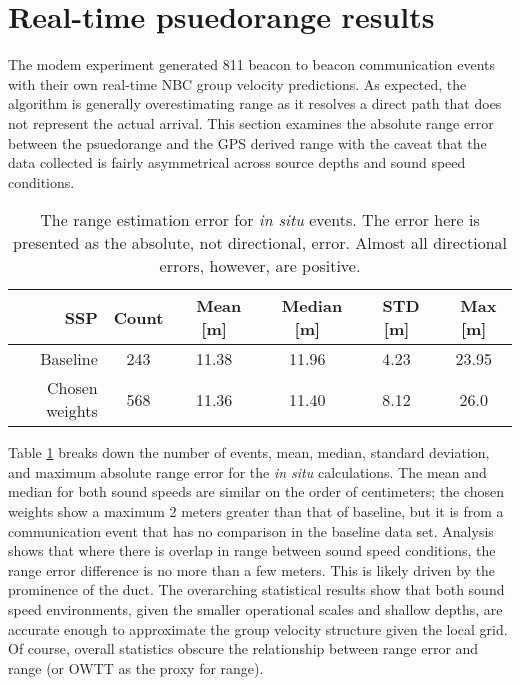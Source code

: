 \FloatBarrier
\section{\label{sec:4} Real-time psuedorange results}

The modem experiment generated 811 beacon to beacon communication events with their own real-time NBC group velocity predictions.
As expected, the algorithm is generally overestimating range as it resolves a direct path that does not represent the actual arrival.
This section examines the absolute range error between the psuedorange and the GPS derived range with the caveat that the data collected is fairly asymmetrical across source depths and sound speed conditions.

\begin{table}[h!]
\renewcommand{\arraystretch}{1.3}
\centering
\begin{tabular}{r|c|c|c|c|c}
SSP & Count & ~Mean [m] & ~Median [m] & ~STD [m] & ~Max [m] \\ \hline
Baseline & 243 & 11.38 & 11.96 & 4.23 & 23.95 \\ 
Chosen weights & 568 & 11.36 & 11.40 & 8.12 & 26.0 \\
\end{tabular}
\caption[Range estimation error for \textit{in situ} events]{The range estimation error for \textit{in situ} events. The error here is presented as the absolute, not directional, error. Almost all directional errors, however, are positive.}
\label{tab:rangeErrorInSitu}
\end{table}

Table \ref{tab:rangeErrorInSitu} breaks down the number of events, mean, median, standard deviation, and maximum absolute range error for the \textit{in situ} calculations.
The mean and median for both sound speeds are similar on the order of centimeters; the chosen weights show a maximum 2 meters greater than that of baseline, but it is from a communication event that has no comparison in the baseline data set.
Analysis shows that where there is overlap in range between sound speed conditions, the range error difference is no more than a few meters.
This is likely driven by the prominence of the duct.
The overarching statistical results show that both sound speed environments, given the smaller operational scales and shallow depths, are accurate enough to approximate the group velocity structure given the local grid.
Of course, overall statistics obscure the relationship between range error and range (or OWTT as the proxy for range).

